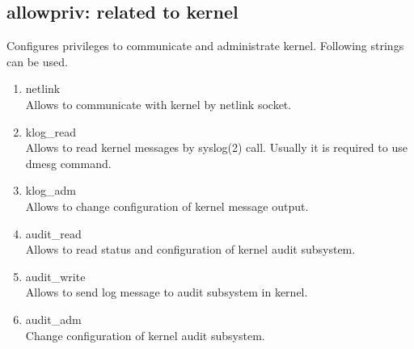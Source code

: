 \documentclass{article}
\begin{document}
\subsection{allowpriv: related to kernel}
Configures privileges to communicate and administrate kernel. 
Following strings can be used.
       \begin{enumerate}
	\item netlink\\
	      Allows to communicate with kernel by netlink socket. 
	\item klog\_read\\
	      Allows to read kernel messages by syslog(2) call. Usually
	      it is required to use dmesg command.
	\item klog\_adm\\
	      Allows to change configuration of kernel message output.
	\item audit\_read\\
	      Allows to read status and configuration of kernel audit
           subsystem.
	\item audit\_write\\
	      Allows to send log message to audit subsystem in
	      kernel.
	\item audit\_adm\\
	      Change configuration of kernel audit subsystem.
       
       \end{enumerate}
\end{document}
